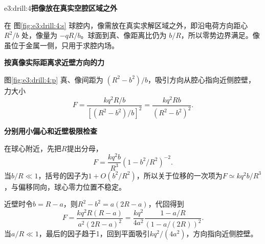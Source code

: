\begin{drillsolution}{e3:drill:4}\textbf{把像放在真实空腔区域之外}\par\nobreak
在 图\ref{fig:e3:drill:4:s} 球腔内，像需放在真实求解区域之外，即沿电荷方向距心 $R^2/b$ 处，像量为 $-qR/b$。球面到真、像距离比仍为 $b/R$，所以零势边界满足。像虽位于金属一侧，只用于求腔内场。



\par\medskip{}\noindent\textbf{按真像实际距离求近壁方向的力}\par\nobreak
图\ref{fig:e3:drill:4:p} 真、像间距为 $(R^2-b^2)/b$，吸引方向从腔心指向近侧腔壁，力大小
\[
 F=\frac{kq^2R/b}{[(R^2-b^2)/b]^2}
 =\frac{kq^2Rb}{(R^2-b^2)^2}.
\]


\par\medskip{}\noindent\textbf{分别用小偏心和近壁极限检查}\par\nobreak
在球心附近，先把$R$提出分母，
\[
F=\frac{kq^2b}{R^3}(1-b^2/R^2)^{-2}.
\]
当$b/R\ll1$，括号的因子为$1+O(b^2/R^2)$，所以关于位移的一次项为$F\simeq kq^2b/R^3$，与偏移同向，球心零力位置不稳定。

近壁时令$b=R-a$，则$R^2-b^2=a(2R-a)$，代回得到
\[
F=\frac{kq^2R(R-a)}{a^2(2R-a)^2}
=\frac{kq^2}{4a^2}\frac{1-a/R}{(1-a/(2R))^2}.
\]
当$a/R\ll1$，最后的因子趋于1，回到平面吸引$kq^2/(4a^2)$，方向指向近侧腔壁。\end{drillsolution}
